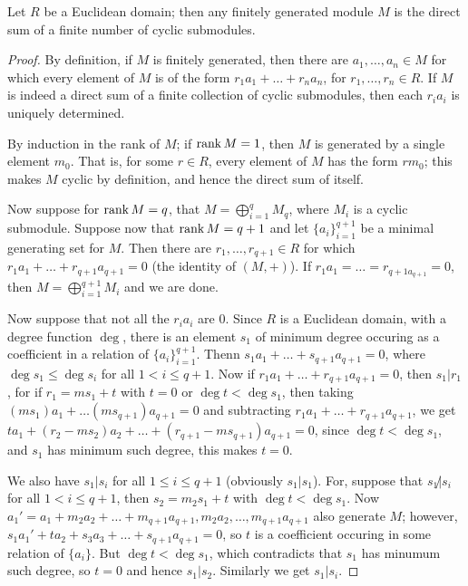 \begin{theorem}\label{1.5.1}
    Let $R$ be a Euclidean domain; then any finitely generated module  $M$ is the direct sum of a
    finite number of cyclic submodules.
\end{theorem}
\begin{proof}
    By definition, if $M$ is finitely generated, then there are  $a_1, \dots, a_n \in M$ for which
    every element of $M$ is of the form  $r_1a_1+\dots+r_na_n$, for $r_1, \dots, r_n \in R.$ If $M$
    is indeed a direct sum of a finite collection of cyclic submodules, then each  $r_ia_i$ is
    uniquely determined.

    By induction in the rank of $M$; if  $\rank{M}=1$, then $M$ is generated by a single element
    $m_0$. That is, for some $r \in R$, every element of  $M$ has the form  $rm_0$; this makes $M$
    cyclic by definition, and hence the direct sum of itself.

    Now suppose for  $\rank{M}=q$, that $M=\bigoplus_{i=1}^q{M_q}$, where $M_i$ is a cyclic
    submodule. Suppose now that  $\rank{M}=q+1$ and let $\{a_i\}_{i=1}^{q+1}$ be a minimal
    generating set for $M$. Then there are  $r_1, \dots, r_{q+1} \in R$ for which
    $r_1a_1+\dots+r_{q+1}a_{q+1}=0$ (the identity of $(M,+)$). If $r_1a_1=\dots=r_{q+1a_{q+1}}=0$,
    then $M=\bigoplus_{i=1}^{q+1}{M_i}$ and we are done.

    Now suppose that not all the $r_ia_i$ are  $0$. Since  $R$ is a Euclidean domain, with a degree
    function $\deg$, there is an element  $s_1$ of minimum degree occuring as a coefficient in a
    relation of  $\{a_i\}_{i=1}^{q+1}$. Thenn $s_1a_1+\dots+s_{q+1}a_{q+1}=0$, where $\deg{s_1} \leq 
    \deg{s_i}$ for all $1<i\leq q+1$. Now if  $r_1a_1+\dots+r_{q+1}a_{q+1}=0$, then $s_1|r_1$, for
    if $r_1=ms_1+t$ with $t=0$ or  $\deg{t}<\deg{s_1}$, then taking
    $(ms_1)a_1+\dots(ms_{q+1})a_{q+1}=0$ and subtracting $r_1a_1+\dots+r_{q+1}a_{q+1}$, we get
    $ta_1+(r_2-ms_2)a_2+\dots+(r_{q+1}-ms_{q+1})a_{q+1}=0$, since $\deg{t} < \deg{s_1}$, and $s_1$
    has minimum such degree, this makes $t=0$. 

    We also have $s_1|s_i$ for all $1 \leq i \leq q+1$  (obviously $s_1|s_1$). For, suppose that
    $s_1 \not|s_i$ for all $1<i\leq q+1$, then  $s_2=m_2s_1+t$ with $\deg{t}<\deg{s_1}$. Now
    $a_1'=a_1+m_2a_2+\dots+m_{q+1}a_{q+1}, m_2a_2, \dots, m_{q+1}a_{q+1}$ also generate $M$;
    however, $s_1a_1'+ta_2+s_3a_3+\dots+s_{q+1}a_{q+1}=0$, so $t$ is a coefficient occuring in some
    relation of $\{a_i\}$. But $\deg{t}<\deg{s_1}$, which contradicts that $s_1$ has minumum such
    degree, so $t=0$ and hence  $s_1|s_2$. Similarly we get $s_1|s_i$.


\end{proof}
